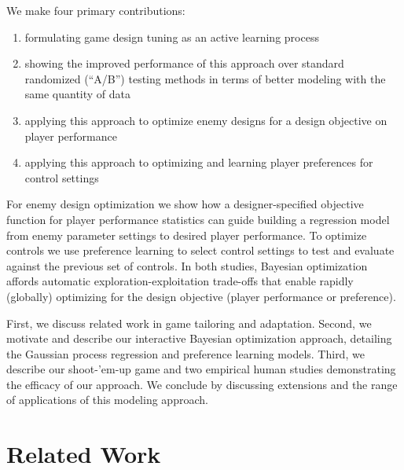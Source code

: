 \documentclass[letterpaper]{article}
\begin{document}
We make four primary contributions:
\begin{enumerate}
\item formulating game design tuning as an active learning process
\item showing the improved performance of this approach over standard randomized (``A/B'') testing methods in terms of better modeling with the same quantity of data
\item applying this approach to optimize enemy designs for a design objective on player performance
\item applying this approach to optimizing and learning player preferences for control settings
\end{enumerate}
For enemy design optimization we show how a designer-specified objective function for player performance statistics can guide building a regression model from enemy parameter settings to desired player performance. To optimize controls we use preference learning to select control settings to test and evaluate against the previous set of controls. 
In both studies, Bayesian optimization affords automatic exploration-exploitation trade-offs that enable rapidly (globally) optimizing for the design objective (player performance or preference).

First, we discuss related work in game tailoring and adaptation. Second, we motivate and describe our interactive Bayesian optimization approach, detailing the Gaussian process regression and preference learning models. Third, we describe our shoot-'em-up game and two empirical human studies demonstrating the efficacy of our approach. We conclude by discussing extensions and the range of applications of this modeling approach.



\section{Related Work}
\end{document}
